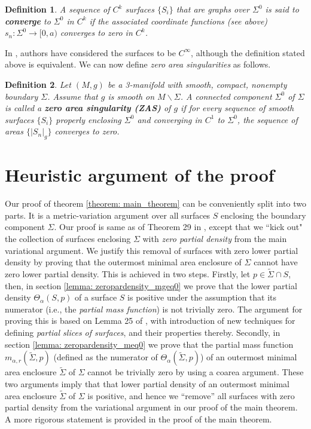 \documentclass{amsart}
\newcommand{\ts}{\tilde{\Sigma}}
\newcommand{\s}{\Sigma}
\newtheorem{definition}{Definition}
\theoremstyle{named}
\begin{document}
\begin{definition}
    A sequence of $C^{k}$ surfaces $\{ S_i \}$ that are graphs over $\s^{0}$ is said to \textbf{converge} to $\s^{0}$ in $C^k$ if the associated coordinate functions (see above) $s_n: \s^{0} \rightarrow [0,a)$ converges to zero in $C^k$.
\end{definition}

In \cite{Bray:2009voj}, authors have considered the surfaces to be $C^{\infty}$, although the definition stated above is equivalent. We can now define \textit{zero area singularities} as follows.

\begin{definition}
    Let $(M,g)$ be a 3-manifold with smooth, compact, nonempty boundary $\s$. Assume that $g$ is smooth on $M \backslash \s$. A connected component $\s^{0}$ of $\s$ is called a \textbf{zero area singularity (ZAS)} of $g$ if for every sequence of smooth surfaces $\{ S_i \}$ properly enclosing $\s^{0}$ and converging in $C^{1}$ to $\s^{0}$, the sequence of areas $\{ |S_n|_g \}$ converges to zero. 
\end{definition}


\section{Heuristic argument of the proof} \label{section: heuristic_proof}

Our proof of theorem \ref{theorem: main_theorem} can be conveniently split into two parts. It is a metric-variation argument over all surfaces $S$ enclosing the boundary component $\s$. Our proof is same as of Theorem 29 in \cite{jeff}, except that we ``kick out" the collection of surfaces enclosing $\s$ with \textit{zero partial density} from the main variational argument. We justify this removal of surfaces with zero lower partial density by proving that the outermost minimal area enclosure of $\s$ cannot have zero lower partial density. This is achieved in two steps. Firstly, let $p \in \ts \cap S$, then, in section \ref{lemma: zeropardensity_mgeq0} we prove that the lower partial density $\Theta_{\alpha}(S,p)$ of a surface $S$ is positive under the assumption that its numerator (i.e., the \textit{partial mass function}) is not trivially zero. The argument for proving this is based on Lemma 25 of \cite{jeff}, with introduction of new techniques for defining \textit{partial slices of surfaces}, and their properties thereby. Secondly, in section \ref{lemma: zeropardensity_meq0} we prove that the partial mass function $m_{\alpha,r}(\ts,p)$ (defined as the numerator of $\Theta_{\alpha}(\ts,p)$) of an outermost minimal area enclosure $\ts$ of $\s$ cannot be trivially zero by using a coarea argument. These two arguments imply that that lower partial density of an outermost minimal area enclosure $\ts$ of $\s$ is positive, and hence we ``remove'' all surfaces with zero partial density from the variational argument in our proof of the main theorem. A more rigorous statement is provided in the proof of the main theorem.\\ 
\end{document}
